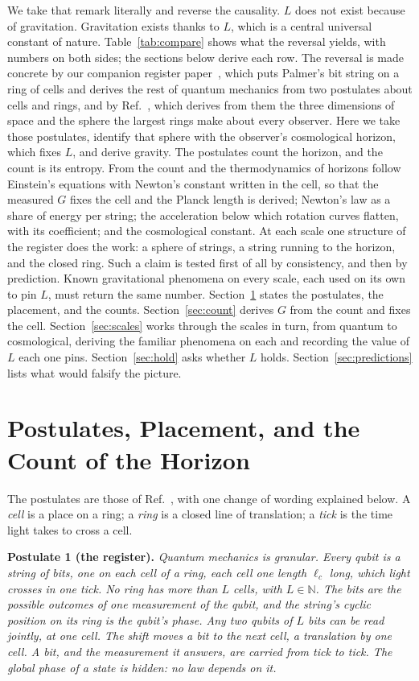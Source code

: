 \documentclass[aps,prd,twocolumn,superscriptaddress,nofootinbib,showkeys]{revtex4-2}
\newcommand{\lc}{\ell_c}
\begin{document}
We take that remark literally and reverse the causality. $L$ does not exist because of gravitation. Gravitation exists thanks to $L$, which is a central universal constant of nature. Table~\ref{tab:compare} shows what the reversal yields, with numbers on both sides; the sections below derive each row. The reversal is made concrete by our companion register paper~\cite{korytko2026c}, which puts Palmer's bit string on a ring of cells and derives the rest of quantum mechanics from two postulates about cells and rings, and by Ref.~\cite{korytko2026d}, which derives from them the three dimensions of space and the sphere the largest rings make about every observer. Here we take those postulates, identify that sphere with the observer's cosmological horizon, which fixes $L$, and derive gravity. The postulates count the horizon, and the count is its entropy. From the count and the thermodynamics of horizons follow Einstein's equations with Newton's constant written in the cell, so that the measured $G$ fixes the cell and the Planck length is derived; Newton's law as a share of energy per string; the acceleration below which rotation curves flatten, with its coefficient; and the cosmological constant. At each scale one structure of the register does the work: a sphere of strings, a string running to the horizon, and the closed ring. Such a claim is tested first of all by consistency, and then by prediction. Known gravitational phenomena on every scale, each used on its own to pin $L$, must return the same number. Section~\ref{sec:postulates} states the postulates, the placement, and the counts. Section~\ref{sec:count} derives $G$ from the count and fixes the cell. Section~\ref{sec:scales} works through the scales in turn, from quantum to cosmological, deriving the familiar phenomena on each and recording the value of $L$ each one pins. Section~\ref{sec:hold} asks whether $L$ holds. Section~\ref{sec:predictions} lists what would falsify the picture.


\section{Postulates, Placement, and the Count of the Horizon}
\label{sec:postulates}

The postulates are those of Ref.~\cite{korytko2026c}, with one change of wording explained below. A \emph{cell} is a place on a ring; a \emph{ring} is a closed line of translation; a \emph{tick} is the time light takes to cross a cell.

\textbf{Postulate 1 (the register).} \emph{Quantum mechanics is granular. Every qubit is a string of bits, one on each cell of a ring, each cell one length $\lc$ long, which light crosses in one tick. No ring has more than $L$ cells, with $L\in\mathbb{N}$. The bits are the possible outcomes of one measurement of the qubit, and the string's cyclic position on its ring is the qubit's phase. Any two qubits of $L$ bits can be read jointly, at one cell. The shift moves a bit to the next cell, a translation by one cell. A bit, and the measurement it answers, are carried from tick to tick. The global phase of a state is hidden: no law depends on it.}
\end{document}
